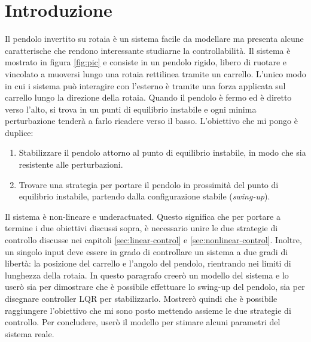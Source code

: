 \section{Introduzione}
Il pendolo invertito su rotaia è un sistema facile da modellare
ma presenta alcune caratterische che rendono interessante studiarne la controllabilità.
Il sistema è mostrato in figura \ref{fig:pic} e consiste in un pendolo rigido, libero di ruotare e vincolato a muoversi lungo una rotaia rettilinea tramite un carrello. L'unico modo in cui i sistema può interagire con l'esterno è tramite una forza applicata sul carrello lungo la direzione della rotaia. Quando il pendolo è fermo ed è diretto verso l'alto, si trova in un punti di equilibrio instabile e ogni minima perturbazione tenderà a farlo ricadere verso il basso. L'obiettivo che mi pongo è duplice:

\begin{enumerate}
    \item Stabilizzare il pendolo attorno al punto di equilibrio instabile, in modo che sia resistente alle perturbazioni.
    \item Trovare una strategia per portare il pendolo in prossimità del punto di equilibrio instabile, partendo dalla configurazione stabile (\emph{swing-up}).
\end{enumerate}

Il sistema è non-lineare e underactuated. Questo significa che per portare a termine i due obiettivi discussi sopra, è necessario unire le due strategie di controllo discusse nei capitoli \ref{sec:linear-control}  e \ref{sec:nonlinear-control}. Inoltre, un singolo input deve essere in grado di controllare un sistema a due gradi di libertà: la posizione del carrello e l'angolo del pendolo, rientrando nei limiti di lunghezza della rotaia. In questo paragrafo creerò un modello del sistema e lo userò sia per dimostrare che è possibile effettuare lo swing-up del pendolo, sia per disegnare controller LQR per stabilizzarlo. Mostrerò quindi che è possibile raggiungere l'obiettivo che mi sono posto mettendo assieme le due strategie di controllo. Per concludere, userò il modello per stimare alcuni parametri del sistema reale.

